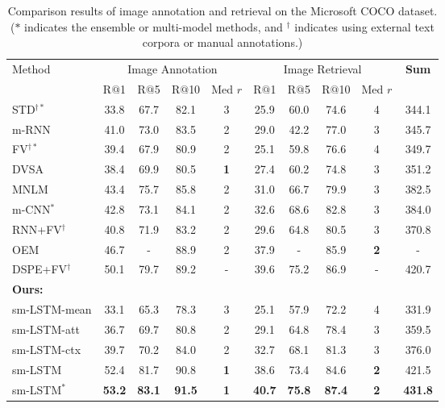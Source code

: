 \documentclass[10pt,twocolumn,letterpaper]{article}
\begin{document}
\begin{table*}[t] \small
\centering
\caption{Comparison results of image annotation and retrieval on the Microsoft COCO dataset. ($*$ indicates the ensemble or multi-model methods,
and $^{\dag}$ indicates using external text corpora or manual annotations.)}
\begin{tabular}{l|cccc|cccc|c}
\hline
\hline
\multirow{2}{0.7cm}{Method}     &  \multicolumn{4}{c|}{Image Annotation}  &  \multicolumn{4}{c|}{Image Retrieval} & \multirow{2}{0.7cm}{\textbf{Sum}}  \\
\cline{2-9}
     & R$@$1 & R$@$5  & R$@$10  & Med $r$  & R$@$1 & R$@$5  & R$@$10  & Med $r$ &    \\
\hline
STD$^{\dag*}$ \cite{kiros2015skip} &33.8 &67.7 &82.1 &3 &25.9 &60.0 &74.6 &4 & 344.1\\
m-RNN \cite{mao2014explain}           &41.0 &73.0 &83.5 &{2} &29.0 &42.2 &77.0 &{3} & 345.7\\
FV$^{\dag*}$ \cite{klein2015associating}     &39.4 &67.9 &80.9 &{2} &25.1 &59.8 &76.6 &4 & 349.7\\
DVSA \cite{karpathy2014vsa}               &38.4 &69.9 &80.5 &\bf{1} &27.4 &60.2 &74.8 &{3} & 351.2\\
MNLM \cite{kiros2014unifying}        &43.4 &75.7 &85.8 &{2} &31.0 &66.7 &79.9 &{3} & 382.5\\
m-CNN$^*$ \cite{ma2015multimodal}              &42.8 &73.1 &84.1 &{2} &32.6 &{68.6} &{82.8} &{3} & 384.0\\
RNN+FV$^{\dag}$ \cite{lev2015rnn}          &40.8 &71.9 &83.2 &2 &29.6 &64.8 &80.5 &3 & 370.8\\
OEM \cite{vendrov2015order}       &46.7 &- &88.9 &2 &37.9 &- &85.9 &\bf{2} &-\\
DSPE+FV$^{\dag}$ \cite{wang2015learning}       &50.1 &79.7 &89.2 &- &39.6 &75.2 &86.9 &- & 420.7\\


\hline
\bf{Ours}:      & & & & & & & &\\
\hspace{0mm} sm-LSTM-mean      &33.1 &65.3 &78.3 &3 &25.1 &57.9 &72.2 &4 &331.9 \\
\hspace{0mm} sm-LSTM-att      &36.7 &69.7 &80.8 &2 &{29.1} &{64.8} &{78.4} &3 &{359.5} \\
\hspace{0mm} sm-LSTM-ctx            &39.7 &70.2 &84.0 &2 &32.7 &68.1 &81.3 &3 &376.0\\
\hspace{0mm} sm-LSTM            &52.4 &81.7 &90.8 &\bf{1} &38.6 &73.4 &84.6 &\bf{2} &421.5\\
\hspace{0mm} sm-LSTM$^*$      &\bf{53.2} &\bf{83.1} &\bf{91.5} &\bf{1} &\bf{40.7} &\bf{75.8} &\bf{87.4} &\bf{2} & \bf{431.8}\\






\hline
\hline
\end{tabular}
\label{table:coco}
\end{table*}
\end{document}
